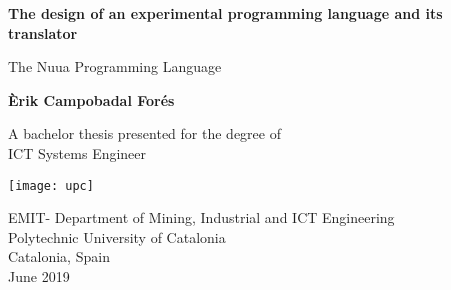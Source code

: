 \begin{titlepage}
    \begin{center}
        \vspace*{1cm}

        \huge
        \textbf{The design of an experimental programming language and its translator}

        \vspace{0.5cm}

        \Large
        The Nuua Programming Language

        \vspace{1.5cm}

        \textbf{Èrik Campobadal Forés}

        \vfill

        A bachelor thesis presented for the degree of\\
        ICT Systems Engineer

        \vspace{1cm}

        \texttt{[image: upc]}

        \vspace{1cm}

        \large
        EMIT- Department of Mining, Industrial and ICT Engineering\\
        Polytechnic University of Catalonia\\
        Catalonia, Spain\\
        June 2019

    \end{center}
\end{titlepage}
